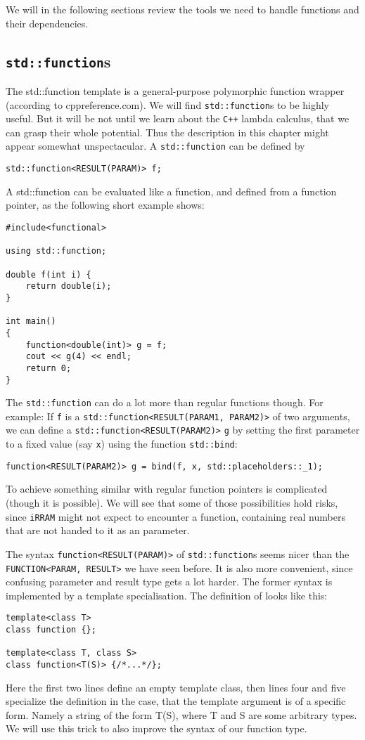 \documentclass{article}
\newcommand{\irram}{\texttt{iRRAM}\xspace}
\newcommand{\cc}{\texttt{C++}\xspace}
\newcommand{\ir}[1]{\texttt{#1}}
\newcommand{\code}[1]{\texttt{#1}}
\begin{document}
We will in the following sections review the tools we need to handle functions and their dependencies.

\subsection{\code{std::function}s}

The std::function template is a general-purpose polymorphic function wrapper (according to cppreference.com). We will find \code{std::function}s to be highly useful. But it will be not until we learn about the \cc lambda calculus, that we can grasp their whole potential. Thus the description in this chapter might appear somewhat unspectacular. A \code{std::function} can be defined by
\begin{lstlisting}
std::function<RESULT(PARAM)> f;
\end{lstlisting}

A std::function can be evaluated like a function, and defined from a function pointer, as the following short example shows:
\begin{lstlisting}
#include<functional>

using std::function;

double f(int i) {
	return double(i);
}

int main()
{
	function<double(int)> g = f;
	cout << g(4) << endl;
	return 0;
}
\end{lstlisting}

The \code{std::function} can do a lot more than regular functions though. For example: If \code{f} is a \code{std::function<RESULT(PARAM1, PARAM2)>} of two arguments, we can define a \code{std::function<RESULT(PARAM2)>} \code{g} by setting the first parameter to a fixed value (say \code x) using the function \code{std::bind}:
\begin{lstlisting}
function<RESULT(PARAM2)> g = bind(f, x, std::placeholders::_1);
\end{lstlisting}
To achieve something similar with regular function pointers is complicated (though it is possible). We will see that some of those possibilities hold risks, since \irram might not expect to encounter a function, containing real numbers that are not handed to it as an parameter.

The syntax \code{function<RESULT(PARAM)>} of \code{std::function}s seems nicer than the \ir{FUNCTION<PARAM, RESULT>} we have seen before. It is also more convenient, since confusing parameter and result type gets a lot harder. The former syntax is implemented by a template specialisation. The definition of looks like this:
\begin{lstlisting}
template<class T>
class function {};

template<class T, class S>
class function<T(S)> {/*...*/};
\end{lstlisting}
Here the first two lines define an empty template class, then lines four and five specialize the definition in the case, that the template argument is of a specific form. Namely a string of the form T(S), where T and S are some arbitrary types. We will use this trick to also improve the syntax of our function type.
\end{document}
